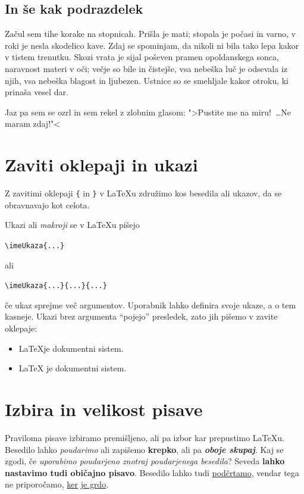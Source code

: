 \documentclass[a4paper]{article}
\begin{document}
\subsection{In še kak podrazdelek}

Začul sem tihe korake na stopnicah. Prišla je mati; stopala je počasi in varno, v roki je
nesla skodelico kave. Zdaj se spominjam, da nikoli ni bila tako lepa kakor v tistem
trenutku. Skozi vrata je sijal poševen pramen opoldanskega sonca, naravnost materi v oči;
večje so bile in čistejše, vsa nebeška luč je odsevala iz njih, vsa nebeška blagost in
ljubezen. Ustnice so se smehljale kakor otroku, ki prinaša vesel dar.

Jaz pa sem se ozrl in sem rekel z zlobnim glasom: ">Pustite me na miru!~\dots Ne maram zdaj!"<

\section{Zaviti oklepaji in ukazi}

Z zavitimi oklepaji \texttt{\{} in \texttt{\}} v LaTeXu združimo kos besedila ali ukazov,
da se obravnavajo kot celota.

Ukazi ali \emph{makroji} se v LaTeXu pišejo
%
\begin{center}
  \verb|\imeUkaza{...}|
\end{center}
%
ali
%
\begin{center}
  \verb|\imeUkaza{...}{...}{...}|
\end{center}
%
če ukaz sprejme več argumentov. Uporabnik lahko definira svoje ukaze, a o tem kasneje.
Ukazi brez argumenta ``pojejo'' presledek, zato jih pišemo v zavite oklepaje:
%
\begin{itemize}
\item \LaTeX je dokumentni sistem.
\item {\LaTeX} je dokumentni sistem.
\end{itemize}


\section{Izbira in velikost pisave}

Praviloma pisave izbiramo premišljeno, ali pa izbor kar prepustimo LaTeXu.
Besedilo lahko \emph{poudarimo} ali zapišemo \textbf{krepko}, ali pa \emph{\textbf{oboje skupaj}}.
Kaj se zgodi, če \emph{uporabimo poudarjeno \emph{znotraj} poudarjenega besedila}?
Seveda \textbf{lahko nastavimo tudi \textnormal{običajno} pisavo}.
Besedilo lahko tudi \underline{podčrtamo}, vendar tega ne priporočamo, \underline{ker} \underline{je grdo}.
\end{document}
